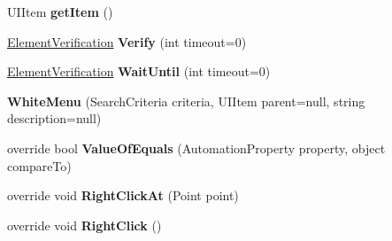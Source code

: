 \begin{DoxyCompactItemize}
\item 
\hypertarget{class_proto_test_1_1_golem_1_1_white_1_1_elements_1_1_white_menu_ae8f56c36836c2504ff07db0addc73049}{U\-I\-Item {\bfseries get\-Item} ()}\label{class_proto_test_1_1_golem_1_1_white_1_1_elements_1_1_white_menu_ae8f56c36836c2504ff07db0addc73049}

\item 
\hypertarget{class_proto_test_1_1_golem_1_1_white_1_1_elements_1_1_white_menu_ae9412e18b50176b235b50078374b89e6}{\hyperlink{class_proto_test_1_1_golem_1_1_white_1_1_element_verification}{Element\-Verification} {\bfseries Verify} (int timeout=0)}\label{class_proto_test_1_1_golem_1_1_white_1_1_elements_1_1_white_menu_ae9412e18b50176b235b50078374b89e6}

\item 
\hypertarget{class_proto_test_1_1_golem_1_1_white_1_1_elements_1_1_white_menu_a710901ba680eff09a177ef26149780ae}{\hyperlink{class_proto_test_1_1_golem_1_1_white_1_1_element_verification}{Element\-Verification} {\bfseries Wait\-Until} (int timeout=0)}\label{class_proto_test_1_1_golem_1_1_white_1_1_elements_1_1_white_menu_a710901ba680eff09a177ef26149780ae}

\item 
\hypertarget{class_proto_test_1_1_golem_1_1_white_1_1_elements_1_1_white_menu_a9c627b192ef5c050477dcfe51a0f2c06}{{\bfseries White\-Menu} (Search\-Criteria criteria, U\-I\-Item parent=null, string description=null)}\label{class_proto_test_1_1_golem_1_1_white_1_1_elements_1_1_white_menu_a9c627b192ef5c050477dcfe51a0f2c06}

\item 
\hypertarget{class_proto_test_1_1_golem_1_1_white_1_1_elements_1_1_white_menu_af4185c292b4c1f72e048f080678c5d1b}{override bool {\bfseries Value\-Of\-Equals} (Automation\-Property property, object compare\-To)}\label{class_proto_test_1_1_golem_1_1_white_1_1_elements_1_1_white_menu_af4185c292b4c1f72e048f080678c5d1b}

\item 
\hypertarget{class_proto_test_1_1_golem_1_1_white_1_1_elements_1_1_white_menu_a5ca35c3cbd928bb0f79408e10991972e}{override void {\bfseries Right\-Click\-At} (Point point)}\label{class_proto_test_1_1_golem_1_1_white_1_1_elements_1_1_white_menu_a5ca35c3cbd928bb0f79408e10991972e}

\item 
\hypertarget{class_proto_test_1_1_golem_1_1_white_1_1_elements_1_1_white_menu_a4b5ddf843921a6527a61c4ce89ad2a5b}{override void {\bfseries Right\-Click} ()}\label{class_proto_test_1_1_golem_1_1_white_1_1_elements_1_1_white_menu_a4b5ddf843921a6527a61c4ce89ad2a5b}


\end{DoxyCompactItemize}
